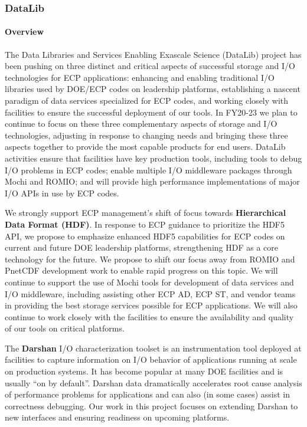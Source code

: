 \subsubsection{ DataLib} 

\paragraph{Overview} 

The Data Libraries and Services Enabling Exascale Science (DataLib)
project has been pushing on three distinct and critical
aspects of successful storage and I/O technologies for ECP applications:
enhancing and enabling traditional I/O libraries used by DOE/ECP
codes on leadership platforms, establishing a nascent paradigm of data
services specialized for ECP codes, and working closely with facilities
to ensure the successful deployment of our tools. In FY20-23 we plan to
continue to focus on these three complementary aspects of storage and
I/O technologies, adjusting in response to changing needs and bringing
these three aspects together to provide the most capable products for
end users. DataLib activities ensure that facilities have key production
tools, including tools to debug I/O problems in ECP codes; enable multiple
I/O middleware packages through Mochi and ROMIO; and will provide high
performance implementations of major I/O APIs in use by ECP codes.

We strongly support ECP management’s shift of focus towards
\textbf{Hierarchical Data Format (HDF)}. In response to ECP guidance
to prioritize the HDF5 API, we propose to emphasize enhanced HDF5
capabilities for ECP codes on current and future DOE leadership
platforms, strengthening HDF as a core technology for the future. We
propose to shift our focus away from ROMIO and PnetCDF development work
to enable rapid progress on this topic. We will continue to support the
use of Mochi tools for development of data services and I/O middleware,
including assisting other ECP AD, ECP ST, and vendor teams in providing
the best storage services possible for ECP applications. We will also
continue to work closely with the facilities to ensure the availability
and quality of our tools on critical platforms.

The \textbf{Darshan} I/O characterization toolset is an instrumentation tool
deployed at facilities to capture information on I/O behavior of
applications running at scale on production systems. It has become
popular at many DOE facilities and is usually “on by default”. Darshan
data dramatically accelerates root cause analysis of performance
problems for applications and can also (in some cases) assist in
correctness debugging. Our work in this project focuses on extending
Darshan to new interfaces and ensuring readiness on upcoming
platforms.

